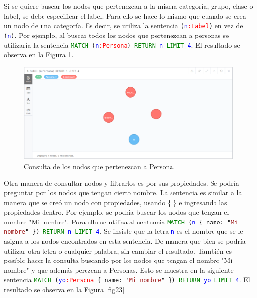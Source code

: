\documentclass[conference]{IEEEtran}
\begin{document}
Si se quiere buscar los nodos que pertenezcan a la misma categoría, grupo, clase o label, se debe especificar el label. Para ello se hace lo mismo que cuando se crea un nodo de una categoría. Es decir, se utiliza la sentencia \texttt{(\textcolor{blue}{n}\textcolor{red}{:Label})} en vez de \texttt{(\textcolor{blue}{n})}. Por ejemplo, al buscar todos los nodos que pertenezcan a personas se utilizaría la sentencia \texttt{\textcolor{green}{MATCH} (\textcolor{blue}{n}\textcolor{red}{:Persona}) \textcolor{green}{RETURN} \textcolor{blue}{n} \textcolor{green}{LIMIT} \textcolor{blue}{4}}. El resultado se observa en la Figura \ref{fig22}.


\begin{figure}[H]
\begin{center}
\includegraphics[width= 0.45 \textwidth]{consulta_label1.png}
\end{center}
\caption{Consulta de los nodos que pertenezcan a Persona.}
\label{fig22}
\end{figure}

Otra manera de consultar nodos y filtrarlos es por sus propiedades. Se podría preguntar por los nodos que tengan cierto nombre. La sentencia es similar a la manera que se creó un nodo con propiedades, usando \{ \} e ingresando las propiedades dentro. Por ejemplo, se podría buscar los nodos que tengan el nombre "Mi nombre". Para ello se utiliza al sentencia \texttt{\textcolor{green}{MATCH} (\textcolor{blue}{n} \{ name: "\textcolor{brown}{Mi nombre}" \}) \textcolor{green}{RETURN} \textcolor{blue}{n} \textcolor{green}{LIMIT} \textcolor{blue}{4}}. Se insiste que la letra \texttt{\textcolor{blue}{n}} es el nombre que se le asigna a los nodos encontrados en esta sentencia. De manera que bien se podría utilizar otra letra o cualquier palabra, sin cambiar el resultado. También es posible hacer la consulta buscando por los nodos que tengan el nombre "Mi nombre" y que además perezcan a Personas. Esto se muestra en la siguiente sentencia \texttt{\textcolor{green}{MATCH} (\textcolor{blue}{yo}\textcolor{red}{:Persona} \{ name: "\textcolor{brown}{Mi nombre}" \}) \textcolor{green}{RETURN} \textcolor{blue}{yo} \textcolor{green}{LIMIT} \textcolor{blue}{4}}. El resultado se observa en la Figura \ref{fig23}
\end{document}
